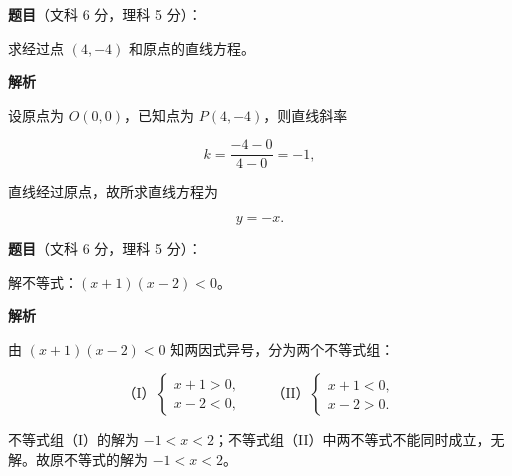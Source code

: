 \begin{answer}

\textbf{题目}（文科 6 分，理科 5 分）：

求经过点 $(4,-4)$ 和原点的直线方程。

\textbf{解析}

设原点为 $O(0,0)$，已知点为 $P(4,-4)$，则直线斜率

\nopagebreak[4]
\[
k=\frac{-4-0}{4-0}=-1,
\]

直线经过原点，故所求直线方程为

\nopagebreak[4]
\[
y=-x.
\]


\end{answer}
\begin{answer}

\textbf{题目}（文科 6 分，理科 5 分）：

解不等式：$(x+1)(x-2)<0$。

\textbf{解析}

由 $(x+1)(x-2)<0$ 知两因式异号，分为两个不等式组：

\nopagebreak[4]
\[
\text{（I）}\begin{cases}x+1>0,\\ x-2<0,\end{cases}
\qquad
\text{（II）}\begin{cases}x+1<0,\\ x-2>0.\end{cases}
\]

不等式组（I）的解为 $-1<x<2$；不等式组（II）中两不等式不能同时成立，无解。故原不等式的解为 $-1<x<2$。


\end{answer}
